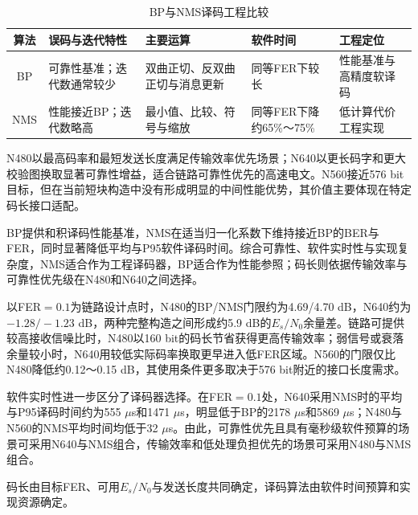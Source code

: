 \begin{table}[!ht]
  \centering\small
  \caption{BP与NMS译码工程比较}
  \label{tab:ldpc-decoder-tradeoff}
  \begin{tabular}{c p{}p{}p{}p{}}
    \toprule
    算法 & 误码与迭代特性 & 主要运算 & 软件时间 & 工程定位\\
    \midrule
    BP & 可靠性基准；迭代数通常较少 & 双曲正切、反双曲正切与消息更新 & 同等FER下较长 & 性能基准与高精度软译码\\
    NMS & 性能接近BP；迭代数略高 & 最小值、比较、符号与缩放 & 同等FER下降约65\%～75\% & 低计算代价工程实现\\
    \bottomrule
  \end{tabular}
\end{table}

N480以最高码率和最短发送长度满足传输效率优先场景；N640以更长码字和更大校验图换取显著可靠性增益，适合链路可靠性优先的高速电文。N560接近576 bit目标，但在当前短块构造中没有形成明显的中间性能优势，其价值主要体现在特定码长接口适配。

BP提供和积译码性能基准，NMS在适当归一化系数下维持接近BP的BER与FER，同时显著降低平均与P95软件译码时间。综合可靠性、软件实时性与实现复杂度，NMS适合作为工程译码器，BP适合作为性能参照；码长则依据传输效率与可靠性优先级在N480和N640之间选择。

以FER$=0.1$为链路设计点时，N480的BP/NMS门限约为4.69/4.70 dB，N640约为$-1.28/-1.23$ dB，两种完整构造之间形成约5.9 dB的$E_s/N_0$余量差。链路可提供较高接收信噪比时，N480以160 bit的码长节省获得更高传输效率；弱信号或衰落余量较小时，N640用较低实际码率换取更早进入低FER区域。N560的门限仅比N480降低约0.12～0.15 dB，其使用条件更多取决于576 bit附近的接口长度需求。

软件实时性进一步区分了译码器选择。在FER$=0.1$处，N640采用NMS时的平均与P95译码时间约为555 $\mu$s和1471 $\mu$s，明显低于BP的2178 $\mu$s和5869 $\mu$s；N480与N560的NMS平均时间均低于32 $\mu$s。由此，可靠性优先且具有毫秒级软件预算的场景可采用N640与NMS组合，传输效率和低处理负担优先的场景可采用N480与NMS组合。

码长由目标FER、可用$E_s/N_0$与发送长度共同确定，译码算法由软件时间预算和实现资源确定。

